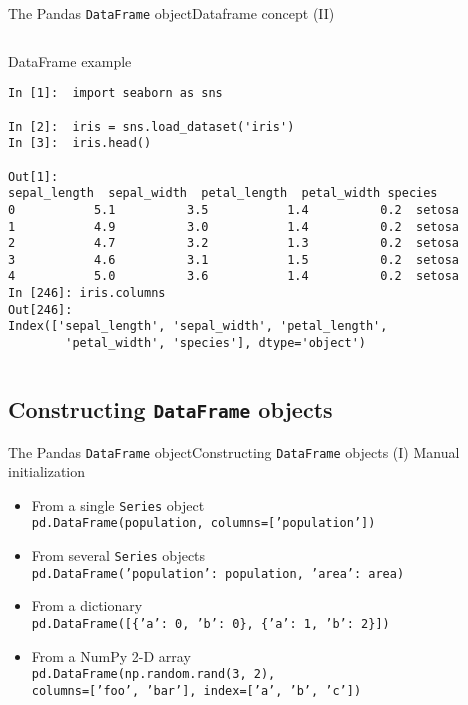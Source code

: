 \documentclass[10pt,compress]{beamer} %
\begin{document}
\begin{frame}[fragile]{The Pandas \texttt{DataFrame} object}{Dataframe concept (II)}
	\begin{columns}
	   \column{\textwidth}
		\begin{exampleblock}{\footnotesize{DataFrame example}}
		\vspace{-0.2cm} 
			\begin{lstlisting}
In [1]:  import seaborn as sns

In [2]:  iris = sns.load_dataset('iris')
In [3]:  iris.head()

Out[1]:
sepal_length  sepal_width  petal_length  petal_width species
0           5.1          3.5           1.4          0.2  setosa
1           4.9          3.0           1.4          0.2  setosa
2           4.7          3.2           1.3          0.2  setosa
3           4.6          3.1           1.5          0.2  setosa
4           5.0          3.6           1.4          0.2  setosa
In [246]: iris.columns
Out[246]: 
Index(['sepal_length', 'sepal_width', 'petal_length', 
        'petal_width', 'species'], dtype='object')
\end{lstlisting}
		\vspace{-0.2cm} 
		\end{exampleblock}
	\end{columns}
\end{frame}

\subsection{Constructing \texttt{DataFrame} objects}
\begin{frame}[fragile]{The Pandas \texttt{DataFrame} object}{Constructing \texttt{DataFrame} objects (I)}
	Manual initialization
	\begin{itemize}
		\item From a single \texttt{Series} object\\
		\texttt{pd.DataFrame(population, columns=['population'])}
		\item From several \texttt{Series} objects\\
		\texttt{pd.DataFrame({'population': population,
		                       'area': area})}
		\item From a dictionary\\
	    \texttt{pd.DataFrame([\{'a': 0, 'b': 0\}, \{'a': 1, 'b': 2\}])}
		\item From a NumPy 2-D array\\
		\texttt{pd.DataFrame(np.random.rand(3, 2), \\columns=['foo', 'bar'], index=['a', 'b', 'c'])}
	\end{itemize}
\end{frame}
\end{document}

